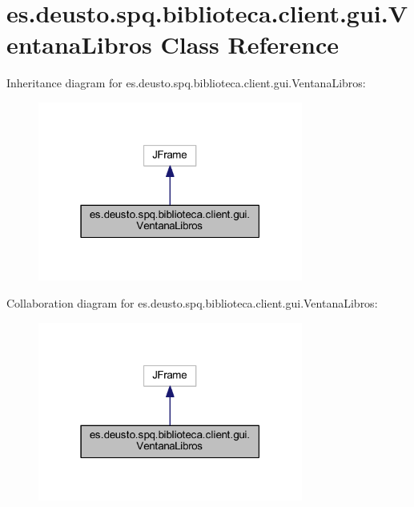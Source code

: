 \hypertarget{classes_1_1deusto_1_1spq_1_1biblioteca_1_1client_1_1gui_1_1_ventana_libros}{}\section{es.\+deusto.\+spq.\+biblioteca.\+client.\+gui.\+Ventana\+Libros Class Reference}
\label{classes_1_1deusto_1_1spq_1_1biblioteca_1_1client_1_1gui_1_1_ventana_libros}


Inheritance diagram for es.\+deusto.\+spq.\+biblioteca.\+client.\+gui.\+Ventana\+Libros\+:
\nopagebreak
\begin{figure}[H]
\begin{center}
\leavevmode
\includegraphics[width=247pt]{classes_1_1deusto_1_1spq_1_1biblioteca_1_1client_1_1gui_1_1_ventana_libros__inherit__graph}
\end{center}
\end{figure}


Collaboration diagram for es.\+deusto.\+spq.\+biblioteca.\+client.\+gui.\+Ventana\+Libros\+:
\nopagebreak
\begin{figure}[H]
\begin{center}
\leavevmode
\includegraphics[width=247pt]{classes_1_1deusto_1_1spq_1_1biblioteca_1_1client_1_1gui_1_1_ventana_libros__coll__graph}
\end{center}
\end{figure}
